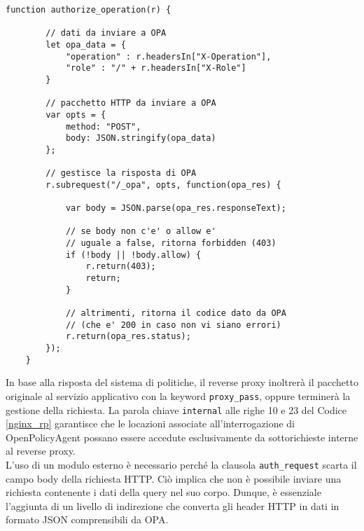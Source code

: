 \begin{lstlisting}[caption={[Frammento di codice del modulo NJS]Frammento di codice del modulo NJS dedicato all'estrazione dei dati e all'invio di questi al sistema delle politiche di accesso. In questo stesso codice viene inoltre gestita la ricezione della risposta e si valuta la decisione contenuta in essa. },captionpos=b,label=NJS]
    function authorize_operation(r) {

        // dati da inviare a OPA
        let opa_data = {
            "operation" : r.headersIn["X-Operation"],
            "role" : "/" + r.headersIn["X-Role"]
        }
    
        // pacchetto HTTP da inviare a OPA
        var opts = {
            method: "POST",
            body: JSON.stringify(opa_data)
        };
        
        // gestisce la risposta di OPA
        r.subrequest("/_opa", opts, function(opa_res) {
    
            var body = JSON.parse(opa_res.responseText);
            
            // se body non c'e' o allow e' 
            // uguale a false, ritorna forbidden (403)
            if (!body || !body.allow) {
                r.return(403);
                return;
            }

            // altrimenti, ritorna il codice dato da OPA 
            // (che e' 200 in caso non vi siano errori)
            r.return(opa_res.status);
        });
    }
\end{lstlisting}
In base alla risposta del sistema di politiche, il reverse proxy inoltrerà il pacchetto originale al servizio applicativo con la keyword \texttt{proxy\_pass}, 
oppure terminerà la gestione della richiesta.
La parola chiave \texttt{internal} alle righe 10 e 23 del Codice \ref{nginx_rp}  garantisce che le locazioni 
associate all'interrogazione di OpenPolicyAgent possano essere accedute esclusivamente da sottorichieste interne al reverse proxy. 
\\ L'uso di un modulo esterno è necessario perché la clausola \texttt{auth\_request} scarta il campo body della 
richiesta HTTP. Ciò implica che non è possibile inviare una richiesta contenente i dati della query nel suo corpo.
Dunque, è essenziale l'aggiunta di un livello di indirezione che converta gli header HTTP in dati in formato
JSON comprensibili da OPA. 


